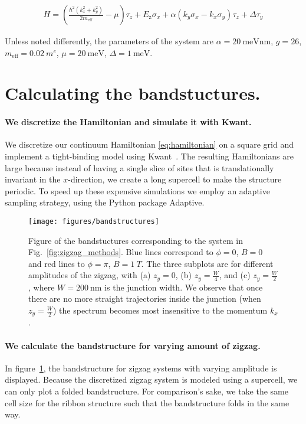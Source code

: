 \documentclass[english, twocolumn, 10pt, aps, superscriptaddress, floatfix, prb, citeautoscript]{revtex4-1}
\newcommand{\kx}{k_x}
\newcommand{\ky}{k_y}
\newcommand{\meff}{m_\text{eff}}
\renewcommand{\comment}[2]{#2}
\renewcommand{\comment}{\paragraph}
\begin{document}
\begin{small}
\begin{align}
    H = \left(\frac{\hbar^2\left(\kx^2 + \ky^2\right)}{2\meff} - \mu\right)\tau_z+
        E_\text{z} \sigma_x+
        \alpha \left( \ky \sigma_x - \kx \sigma_y \right) \tau_z +
        \Delta \tau_y
\end{align}
\label{eq:hamiltonian}
\end{small}

Unless noted differently, the parameters of the system are $\alpha=\SI{20}{\milli \eV \nm}$, $g=26$, $\meff=\SI{0.02}{\electronmass}$, $\mu=\SI{20}{\milli \eV}$, $\Delta=\SI{1}{\milli \eV}$.

\section{Calculating the bandstuctures.}\label{sec:bandstuctures}

\comment{We discretize the Hamiltonian and simulate it with Kwant.}
We discretize our continuum Hamiltonian \eqref{eq:hamiltonian} on a square grid and implement a tight-binding model using Kwant~\cite{groth_kwant:_2014}.
The resulting Hamiltonians are large because instead of having a single slice of sites that is translationally invariant in the $x$-direction, we create a long supercell to make the structure periodic.
To speed up these expensive simulations we employ an adaptive sampling strategy, using the Python package Adaptive. %

\begin{figure}[!htb]
\texttt{[image: figures/bandstructures]}
\caption{Figure of the bandstuctures corresponding to the system in Fig.~\ref{fig:zigzag_methods}.
Blue lines correspond to $\phi=0$, $B=0$ and red lines to $\phi=\pi$, $B = \SI{1}{T}$.
The three subplots are for different amplitudes of the zigzag, with (a) $z_y=0$, (b) $z_y=\frac{W}{4}$, and (c) $z_y=\frac{W}{2}$, where $W=\SI{200}{\nm}$ is the junction width.
We observe that once there are no more straight trajectories inside the junction (when $z_y=\frac{W}{2}$) the spectrum becomes most insensitive to the momentum $k_x$.\label{fig:bandstuctures}}
\end{figure}

\comment{We calculate the bandstructure for varying amount of zigzag.}
In figure~\ref{fig:bandstuctures}, the bandstructure for zigzag systems with varying amplitude is displayed.
Because the discretized zigzag system is modeled using a supercell, we can only plot a folded bandstructure.
For comparison's sake, we take the same cell size for the ribbon structure such that the bandstructure folds in the same way.
\end{document}
